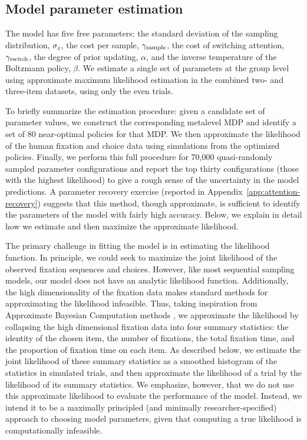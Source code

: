 \subsection{Model parameter estimation}\label{sec:attention-estimation}

The model has five free parameters: the standard deviation of the sampling distribution, $\sigma_{x}$, the cost per sample, $\gamma_\text{sample}$, the cost of switching attention, $\gamma_\text{switch}$, the degree of prior updating, $\alpha$, and the inverse temperature of the Boltzmann policy, $\beta$. We estimate a single set of parameters at the group level using approximate maximum likelihood estimation in the combined two- and three-item datasets, using only the even trials.

To briefly summarize the estimation procedure: given a candidate set of parameter values, we construct the corresponding metalevel MDP and identify a set of 80 near-optimal policies for that MDP. We then approximate the likelihood of the human fixation and choice data using simulations from the optimized policies. Finally, we perform this full procedure for 70,000 quasi-randomly sampled parameter configurations and report the top thirty configurations (those with the highest likelihood) to give a rough sense of the uncertainty in the model predictions. A parameter recovery exercise (reported in Appendix~\ref{app:attention-recovery}) suggests that this method, though approximate, is sufficient to identify the parameters of the model with fairly high accuracy. Below, we explain in detail how we estimate and then maximize the approximate likelihood.
 
The primary challenge in fitting the model is in estimating the likelihood function. In principle, we could seek to maximize the joint likelihood of the observed fixation sequences and choices. However, like most sequential sampling models, our model does not have an analytic likelihood function. Additionally, the high dimensionality of the fixation data makes standard methods for approximating the likelihood \citep{turner2014generalized,opheusden2020unbiased} infeasible. Thus, taking inspiration from Approximate Bayesian Computation methods \citep{sunnaker2013approximate,csillery2010approximate}, we approximate the likelihood by collapsing the high dimensional fixation data into four summary statistics: the identity of the chosen item, the number of fixations, the total fixation time, and the proportion of fixation time on each item. As described below, we estimate the joint likelihood of these summary statistics as a smoothed histogram of the statistics in simulated trials, and then approximate the likelihood of a trial by the likelihood of its summary statistics. We emphasize, however, that we do not use this approximate likelihood to evaluate the performance of the model. Instead, we intend it to be a maximally principled (and minimally researcher-specified) approach to choosing model parameters, given that computing a true likelihood is computationally infeasible.



